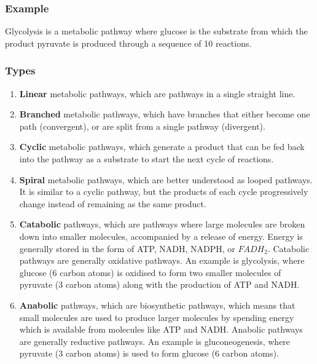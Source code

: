 \documentclass[11pt]{article}
\begin{document}
\subsubsection{Example}
\label{sec:org48103ee}
Glycolysis is a metabolic pathway where glucose is the substrate from which the product pyruvate is produced through a sequence of 10 reactions.

\subsubsection{Types}
\label{sec:org1283979}
\begin{enumerate}
\item \textbf{Linear} metabolic pathways, which are pathways in a single straight line.
\item \textbf{Branched} metabolic pathways, which have branches that either become one path (convergent), or are split from a single pathway (divergent).
\item \textbf{Cyclic} metabolic pathways, which generate a product that can be fed back into the pathway as a substrate to start the next cycle of reactions.
\item \textbf{Spiral} metabolic pathways, which are better understood as looped pathways. It is similar to a cyclic pathway, but the products of each cycle progressively change instead of remaining as the same product.
\item \textbf{Catabolic} pathways, which are pathways where large molecules are broken down into smaller molecules, accompanied by a release of energy. Energy is generally stored in the form of ATP, NADH, NADPH, or \(FADH_2\). Catabolic pathways are generally oxidative pathways. An example is glycolysis, where glucose (6 carbon atoms) is oxidised to form two smaller molecules of pyruvate (3 carbon atoms) along with the production of ATP and NADH.
\item \textbf{Anabolic} pathways, which are biosynthetic pathways, which means that small molecules are used to produce larger molecules by spending energy which is available from molecules like ATP and NADH. Anabolic pathways are generally reductive pathways. An example is gluconeogenesis, where pyruvate (3 carbon atoms) is used to form glucose (6 carbon atoms).
\end{enumerate}
\end{document}
